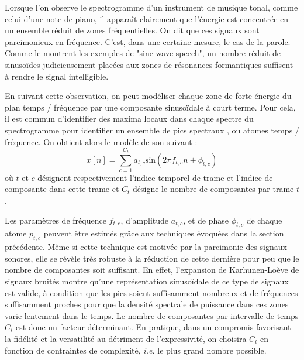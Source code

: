 Lorsque l'on observe le spectrogramme d'un instrument de musique tonal, comme celui d'une note de piano, il apparaît clairement que l'énergie est concentrée en un ensemble réduit de zones fréquentielles. On dit que ces signaux sont parcimonieux en fréquence. C'est, dans une certaine mesure, le cas de la parole. Comme le montrent les exemples de "sine-wave speech", un nombre réduit de sinusoïdes judicieusement placées aux zones de résonances formantiques suffisent à rendre le signal intelligible.

En suivant cette observation, on peut modéliser chaque zone de forte énergie du plan temps / fréquence par une composante sinusoïdale à court terme. Pour cela, il est commun d'identifier des maxima locaux dans chaque spectre du spectrogramme pour identifier un ensemble de \og pics spectraux \fg, ou \og atomes \fg temps / fréquence. On obtient alors le modèle de son suivant :
\begin{equation}
  x[n] = \sum_{c=1}^{C_t} a_{t, c} \mathrm{sin}(2 \pi f_{t, c} n + \phi_{t, c})
  \label{eq:sct}
\end{equation}
où $t$ et $c$ désignent respectivement l'indice temporel de trame et l'indice de composante dans cette trame et $C_t$ désigne le nombre de composantes par trame $t$.

Les paramètres de fréquence $f_{t, c}$, d'amplitude $a_{t, c}$, et de phase $\phi_{t, c}$ de chaque atome $p_{t, c}$ peuvent être estimés grâce aux techniques évoquées dans la section précédente. Même si cette technique est motivée par la parcimonie des signaux sonores, elle se révèle très robuste à la réduction de cette dernière pour peu que le nombre de composantes soit suffisant. En effet, l'expansion de Karhunen-Lo\`eve de signaux bruités montre qu'une représentation sinusoïdale de ce type de signaux est valide, à condition que les pics soient suffisamment nombreux et de fréquences suffisamment proches pour que la densité spectrale de puissance dans ces zones varie lentement dans le temps. Le nombre de composantes par intervalle de temps $C_t$ est donc un facteur déterminant. En pratique, dans un compromis favorisant la fidélité et la versatilité au détriment de l'expressivité, on choisira $C_t$ en fonction de contraintes de complexité, \textit{i.e.} le plus grand nombre possible.

